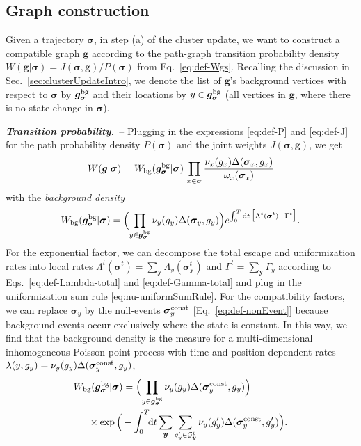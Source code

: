\documentclass[english,10pt,aps,pra,twocolumn,superscriptaddress,floatfix,fleqn]{revtex4-2}
\newcommand{\ud}{\mathrm{d}}
\newcommand{\mc}[1]{\mathcal{#1}}
\renewcommand{\vec}[1]{{\boldsymbol{#1}}}
\newcommand{\G} {\mc{G}}
\newcommand{\vg}{\vec{g}}
\newcommand{\vs}{\vec{\sigma}}
\newcommand{\vy}{\vec{y}}
\newcommand{\const}{\textnormal{const}}
\newcommand{\bg}{\textnormal{bg}}
\newcommand{\Emph}[1]{\emph{\textbf{#1}}}
\begin{document}
\subsection{Graph construction}\label{sec:grapConstruct}
Given a trajectory $\vs$, in step (a) of the cluster update, we want to construct a compatible graph $\vg$ according to the path-graph transition probability density $W(\vg|\vs)= J(\vs,\vg)/P(\vs)$ from Eq.~\eqref{eq:def-Wgs}. Recalling the discussion in Sec.~\ref{sec:clusterUpdateIntro}, we denote the list of $\vg$'s background vertices with respect to $\vs$ by $\vg^\bg_\vs$ and their locations by $y\in\vg^\bg_\vs$ (all vertices in $\vg$, where there is no state change in $\vs$).

\Emph{Transition probability.}~-- Plugging in the expressions \eqref{eq:def-P} and \eqref{eq:def-J} for the path probability density $P(\vs)$ and the joint weights $J(\vs,\vg)$, we get
\begin{equation}\label{eq:Wgs}
	W(\vg|\vs)= W_\bg(\vg^\bg_\vs|\vs)\, \prod_{x\in\vs}\frac{\nu_x(g_x)\Delta(\vs_x, g_x)}{\omega_x(\vs_x)}
\end{equation}
with the \emph{background density}
\begin{equation*}
	W_\bg(\vg^\bg_\vs|\vs) =\Big(\!\prod_{y\in\vg^\bg_\vs} \nu_y(g_y)\Delta(\vs_y,g_y)\Big)
	 e^{\int_0^T\ud t\,\big[\Lambda^t(\vs^t)-\Gamma^t\big]}.
\end{equation*}
For the exponential factor, we can decompose the total escape and uniformization rates into local rates $\Lambda^t(\vs^t)=\sum_\vy \Lambda_y(\vs_\vy^t)$ and $\Gamma^t=\sum_\vy \Gamma_y$ according to Eqs.~\eqref{eq:def-Lambda-total} and \eqref{eq:def-Gamma-total} and plug in the uniformization sum rule \eqref{eq:nu-uniformSumRule}. For the compatibility factors, we can replace $\vs_y$ by the null-events $\vs_y^{\const}$ [Eq.~\eqref{eq:def-nonEvent}] because background events occur exclusively where the state is constant. In this way, we find that the background density is the measure for a multi-dimensional inhomogeneous Poisson point process \cite{Daley2003} with time-and-position-dependent rates $\lambda(y,g_y)=\nu_y(g_y)\Delta(\vs_y^{\const},g_y)$,
\begin{align}\label{eq:Wgs-bg}
	W_\bg&(\vg^\bg_\vs|\vs) =\Big(\!\prod_{y\in\vg^\bg_\vs} \nu_y(g_y)\Delta(\vs_y^{\const},g_y)\Big) \\ \nonumber
	&\!\!\times \exp\Big(-\int_0^T \!\!\ud t \sum_\vy\sum_{g'_y\in\G_\vy^t} \nu_y(g'_y)\Delta(\vs_y^{\const},g'_y)\Big).
\end{align}
\end{document}
